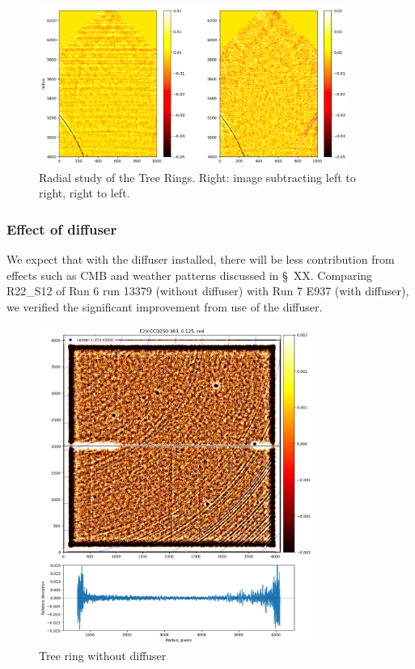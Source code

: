\begin{figure}[ht]
\centering
\includegraphics[width=0.9\textwidth]{figures/TR_radial.png}
\caption{Radial study of the Tree Rings. Right: image subtracting left to right, right to left.}
\end{figure}

\clearpage
\subsubsection{Effect of diffuser}
We expect that with the diffuser installed, there will be less contribution from effects such as CMB and weather patterns discussed in \S~XX. Comparing R22\_S12 of Run 6 run 13379 (without diffuser) with Run 7 E937 (with diffuser), we verified the significant improvement from use of the diffuser.

\begin{figure}[ht]
\centering
\includegraphics[width=0.8\textwidth]{figures/TR_wo_diffuser.png}
\caption{Tree ring without diffuser}
\end{figure}


